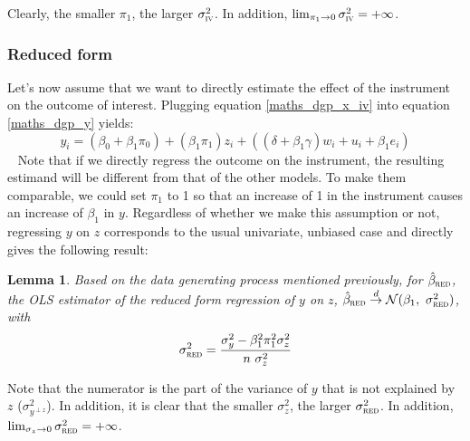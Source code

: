 \documentclass[usletter, 12pt]{article}
\newtheorem{lemma}{Lemma}
\begin{document}
			Clearly, the smaller $\pi_{1}$, the larger $\sigma_{\textsc{iv}}^{2}$. In addition, $\lim_{\pi_{1}\to 0} \sigma_{\textsc{iv}}^{2} = + \infty$.
			

				 

		\subsubsection{Reduced form}
		
			Let's now assume that we want to directly estimate the effect of the instrument on the outcome of interest. Plugging equation \ref{maths_dgp_x_iv} into equation \ref{maths_dgp_y} yields:			
				\[
					y_{i} = (\beta_{0} + \beta_{1}\pi_0) + (\beta_{1}\pi_{1}) z_{i} + ((\delta + \beta_{1}\gamma) w_{i} + u_{i} + \beta_{1}e_{i})
				\]
				~
				Note that if we directly regress the outcome on the instrument, the resulting estimand will be different from that of the other models. To make them comparable, we could set $\pi_{1}$ to 1 so that an increase of 1 in the instrument causes an increase of $\beta_{1}$ in $y$. Regardless of whether we make this assumption or not, regressing $y$ on $z$ corresponds to the usual univariate, unbiased case and directly gives the following result:
				
				\begin{lemma}\label{lemma_red}
					Based on the data generating process mentioned previously, for $\hat{\beta}_{\textsc{red}}$, the OLS estimator of the reduced form regression of $y$ on $z$,  $\hat{\beta}_{\textsc{red}} \overset{d}{\to} \mathcal{N}(\beta_{1}, \ \sigma_{\textsc{red}}^{2})$, with
					\[
						\sigma_{\textsc{red}}^{2} = \dfrac{\sigma_{y}^{2} - \beta_{1}^{2}\pi_{1}^{2}\sigma_{z}^{2}}{n \ \sigma_{z}^{2}}
					\]
				\end{lemma}
				
				Note that the numerator is the part of the variance of $y$ that is not explained by $z$ ($\sigma^{2}_{y^{\perp z}}$). In addition, it is clear that the smaller $\sigma_{z}^{2}$, the larger $\sigma_{\textsc{red}}^{2}$. In addition, $\lim_{\sigma_{z}\to 0} \sigma_{\textsc{red}}^{2} = + \infty$.\\
				
\end{document}

